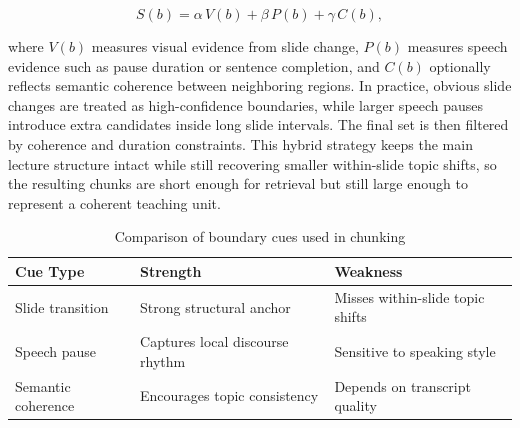 \begin{equation}
S(b) = \alpha \, V(b) + \beta \, P(b) + \gamma \, C(b),
\end{equation}

where $V(b)$ measures visual evidence from slide change, $P(b)$ measures speech evidence such as pause duration or sentence completion, and $C(b)$ optionally reflects semantic coherence between neighboring regions. In practice, obvious slide changes are treated as high-confidence boundaries, while larger speech pauses introduce extra candidates inside long slide intervals. The final set is then filtered by coherence and duration constraints. This hybrid strategy keeps the main lecture structure intact while still recovering smaller within-slide topic shifts, so the resulting chunks are short enough for retrieval but still large enough to represent a coherent teaching unit.

\begin{table}[H]
    \centering
    \caption{Comparison of boundary cues used in chunking}
    \begin{tabular}{@{}lll@{}}
        \toprule
        \textbf{Cue Type} & \textbf{Strength} & \textbf{Weakness} \\ \midrule
        Slide transition & Strong structural anchor & Misses within-slide topic shifts \\
        Speech pause & Captures local discourse rhythm & Sensitive to speaking style \\
        Semantic coherence & Encourages topic consistency & Depends on transcript quality \\ \bottomrule
    \end{tabular}
\end{table}
